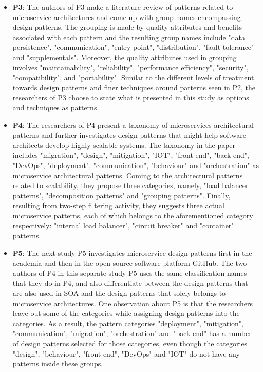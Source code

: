 \documentclass{Configuration_Files/PoliMi3i_thesis}
\begin{document}
\begin{itemize}
    \item \textbf{P3}: The authors of P3 make a literature review of patterns related to microservice architectures and come up with group names encompassing design patterns.
    The grouping is made by quality attributes and benefits associated with each pattern and the resulting group names include "data persistence", "communication", "entry point", "distribution", "fault tolerance" and "supplementals".
    Moreover, the quality attributes used in grouping involves "maintainability", "reliability", "performance efficiency", "security", "compatibility", and "portability".
    Similar to the different levels of treatment towards design patterns and finer techniques around patterns seen in P2, the researchers of P3 choose to state what is presented in this study as options and techniques as patterns.
    
    \item \textbf{P4}: The researchers of P4 present a taxonomy of microservices architectural patterns and further investigates design patterns that might help software architects develop highly scalable systems.
    The taxonomy in the paper includes "migration", "design", "mitigation", "IOT", "front-end", "back-end", "DevOps", "deployment", "communication", "behaviour" and "orchestration" as microservice architectural patterns.
    Coming to the architectural patterns related to scalability, they propose three categories, namely, "load balancer patterns", "decomposition patterns" and "grouping patterns".
    Finally, resulting from two-step filtering activity, they suggests three actual microservice patterns, each of which belongs to the aforementioned category respectively: "internal load balancer", "circuit breaker" and "container" patterns.
    
    \item \textbf{P5}: The next study P5 investigates microservice design patterns first in the academia and then in the open source software platform GitHub.
    The two authors of P4 in this separate study P5 uses the same classification names that they do in P4, and also differentiate between the design patterns that are also used in SOA and the design patterns that solely belongs to microservice architectures.
    One observation about P5 is that the researchers leave out some of the categories while assigning design patterns into the categories.
    As a result, the pattern categories "deployment", "mitigation", "communication", "migration", "orchestration" and "back-end" has a number of design patterns selected for those categories, even though the categories "design", "behaviour", "front-end", "DevOps" and "IOT" do not have any patterns inside these groups.
    

\end{itemize}
\end{document}
